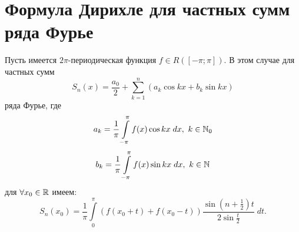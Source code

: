 \documentclass[../../main.tex]{subfiles}
\begin{document}
\section{Формула Дирихле для частных сумм ряда Фурье}
\begin{thm}
	Пусть имеется $2\pi$-периодическая функция $f \in R([-\pi;\pi])$. В этом 
	случае для частных сумм
	\begin{equation}
		\label{18:1}
		S_n(x) = \dfrac{a_0}{2} + \sum_{k=1}^{n}(a_k\cos{kx} + b_k\sin{kx})
	\end{equation} 
	ряда Фурье, где
	\begin{equation}
		\label{18:2}
		a_k = \dfrac{1}{\pi}\int\limits_{-\pi}^{\pi}{f(x)\cos{kx}\; dx},\ k \in \mathbb{N}_0
	\end{equation}
	\begin{equation}
		\label{18:3}
		b_k = \dfrac{1}{\pi}\int\limits_{-\pi}^{\pi}{f(x)\sin{kx}\; dx},\ k \in \mathbb{N}
	\end{equation}
	для $\forall x_0 \in \mathbb{R}$ имеем:
	\begin{equation}
		\label{18:4}
		S_n(x_0)=\dfrac{1}{\pi}\int\limits_{0}^{\pi}({f(x_0 + t) + f(x_0 - t)})
		\dfrac{\sin(n + \frac{1}{2})t}{2\sin{\frac{t}{2}}}\; dt.
	\end{equation}
\end{thm}
\end{document}
